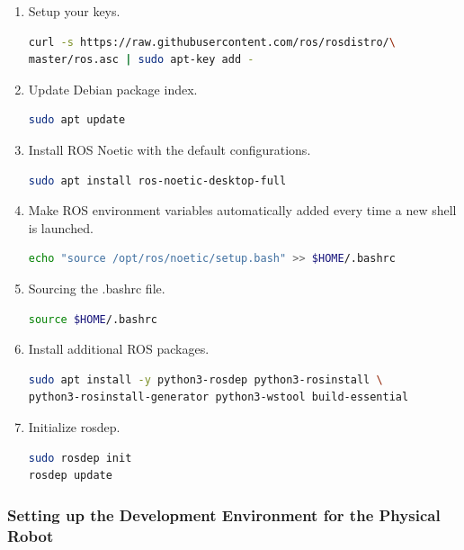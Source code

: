 \documentclass{CSSRforAfrica}
\begin{document}
{{\begin{enumerate}
\item Setup your keys.
\begin{lstlisting}[style=withoutNumbering, language=bash]
curl -s https://raw.githubusercontent.com/ros/rosdistro/\
master/ros.asc | sudo apt-key add -     
\end{lstlisting}           

\item Update Debian package index.
\begin{lstlisting}[style=withoutNumbering, language=bash]
sudo apt update    
\end{lstlisting}

\item Install ROS Noetic with the default configurations.

\begin{lstlisting}[style=withoutNumbering, language=bash]
sudo apt install ros-noetic-desktop-full
\end{lstlisting}

\item Make ROS environment variables automatically added every time a new shell is launched.
\begin{lstlisting}[style=withoutNumbering, language=bash]
echo "source /opt/ros/noetic/setup.bash" >> $HOME/.bashrc
\end{lstlisting}

\item Sourcing the .bashrc file.
\begin{lstlisting}[style=withoutNumbering, language=bash]
source $HOME/.bashrc
\end{lstlisting}

\item Install additional ROS packages.
\begin{lstlisting}[style=withoutNumbering, language=bash]
sudo apt install -y python3-rosdep python3-rosinstall \
python3-rosinstall-generator python3-wstool build-essential
\end{lstlisting}

\item Initialize rosdep.
\begin{lstlisting}[style=withoutNumbering, language=bash]
sudo rosdep init
rosdep update
\end{lstlisting}
\end{enumerate}
}
\subsubsection{Setting up the Development Environment for the Physical Robot}
\label{phyrob}
}
\end{document}
